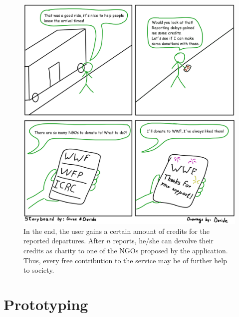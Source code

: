 \documentclass[a4paper, 11pt]{report}
\begin{document}
\vspace{2cm}
\begin{figure}[H]
	\centering
	\includegraphics[width=.9\textwidth]{img/storyboards/storyboard_donations.png}
	\caption{In the end, the user gains a certain amount of credits for the reported departures.
		After $n$ reports, he/she can devolve their credits as charity to one of the NGOs proposed by the application.
		Thus, every free contribution to the service may be of further help to society.}\label{fig:d}
\end{figure}

\chapter{Prototyping}\label{chap:prototyping}
\end{document}
